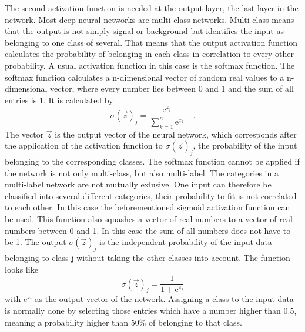 The second activation function is needed at the output layer, the last layer in the network. Most deep neural networks are multi-class networks. Multi-class means that the output is not simply signal or background but identifies the input as belonging to one class of several. That means that the output activation function calculates the probability of belonging in each class in correlation to every other probability. A usual activation function in this case is the softmax function. The softmax function calculates a n-dimensional vector of random real values to a n-dimensional vector, where every number lies between 0 and 1 and the sum of all entries is 1. It is calculated by
\begin{equation}
\sigma (\vec{z})_{j} = \frac{\mathrm{e}^{z_j}}{\sum_{k=1}^{n} \mathrm{e}^{z_k} } \quad .
\end{equation}
The vector $\vec{z}$ is the output vector of the neural network, which corresponds after the application of the activation function to $\sigma (\vec{z})_{j}$, the probability of the input belonging to the corresponding classes.
The softmax function cannot be applied if the network is not only multi-class, but also multi-label. The categories in a multi-label network are not mutually exlusive. One input can therefore be classified into several different categories, their probability to fit is not correlated to each other. In this case the beforementioned sigmoid activation function can be used. This function also squashes a vector of real numbers to a vector of real numbers between 0 and 1. In this case the sum of all numbers does not have to be 1. The output $\sigma (\vec{z})_{j}$ is the independent probability of the input data belonging to class j without taking the other classes into account. The function looks like
\begin{equation}
\sigma (\vec{z})_{j} = \frac{1}{1 + \mathrm{e}^{z_j}}  
\end{equation}
with $\mathrm{e}^{z_j}$ as the output vector of the network.
Assigning a class to the input data is normally done by selecting those entries which have a number higher than 0.5, meaning a probability higher than 50\% of belonging to that class. 

